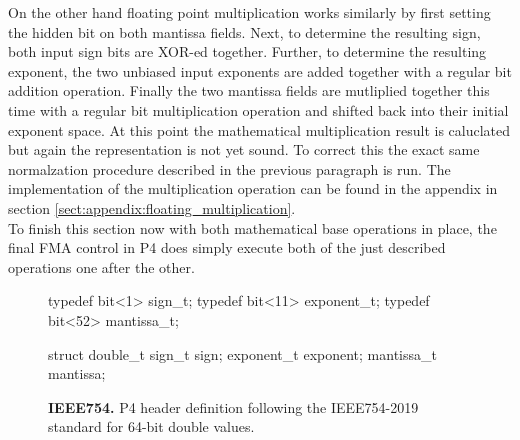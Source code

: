 On the other hand floating point multiplication works similarly by first setting the hidden bit on both mantissa fields. Next, to determine the resulting sign, both input sign bits are XOR-ed together. Further, to determine the resulting exponent, the two unbiased input exponents are added together with a regular bit addition operation. Finally the two mantissa fields are mutliplied together this time with a regular bit multiplication operation and shifted back into their initial exponent space. At this point the mathematical multiplication result is caluclated but again the representation is not yet sound. To correct this the exact same normalzation procedure described in the previous paragraph is run. The implementation of the multiplication operation can be found in the appendix in section \ref{sect:appendix:floating_multiplication}.\\

To finish this section now with both mathematical base operations in place, the final FMA control in P4 does simply execute both of the just described operations one after the other.

\captionsetup[figure]{position=bottom,skip=-10pt,width=.9\linewidth} %
\begin{figure}[ht]
  \begin{P4}
typedef bit<1> sign_t;
typedef bit<11> exponent_t;
typedef bit<52> mantissa_t;

struct double_t {
  sign_t sign;
  exponent_t exponent;
  mantissa_t mantissa;
}\end{P4}
  \caption[Double header definition in P4]{
    \textbf{IEEE754.} P4 header definition following the IEEE754-2019 standard for 64-bit double values.
  }
  \label{fig:double_header}
\end{figure}

